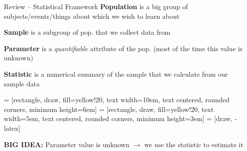 \documentclass{beamer}
\begin{document}
\begin{frame}{Review -- Statistical Framework}
\scriptsize
\textbf{Population} is a big group of subjects/events/things about which we wish to learn about \vspace{2mm}

\textbf{Sample} is a subgroup of pop. that we collect data from\vspace{2mm}

\textbf{Parameter} is a \textit{quantifiable} attribute of the pop. (most of the time this value is unknown) \vspace{2mm}

\textbf{Statistic} is a numerical summary of the sample that we calculate from our sample data

\begin{center}
\usetikzlibrary{decorations.pathreplacing,positioning, arrows, shapes, calc,shapes.multipart}
 = [rectangle, draw, fill=yellow!20, 
    text width=10em, text centered, rounded corners, minimum height=6em]
 = [rectangle, draw, fill=yellow!20, 
    text width=5em, text centered, rounded corners, minimum height=3em]
 = [draw, -latex]
  \end{center}
\textbf{BIG IDEA:} Parameter value is unknown $\rightarrow$ we use the statistic to estimate it  
\end{frame}
\end{document}
